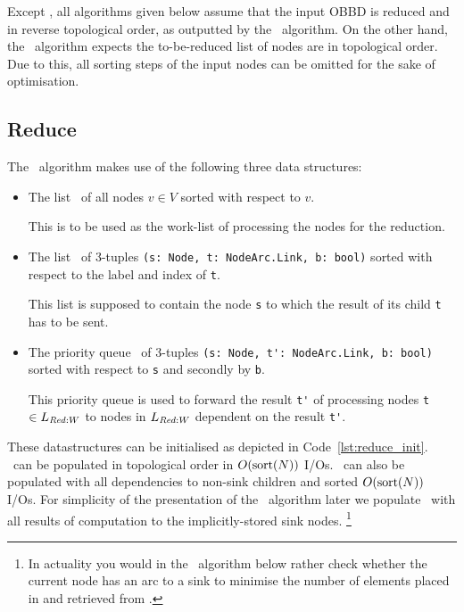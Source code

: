 Except \Reduce, all algorithms given below assume that the input OBBD is reduced
and in reverse topological order, as outputted by the \Reduce\ algorithm. On the
other hand, the \Reduce\ algorithm expects the to-be-reduced list of nodes are
in topological order. Due to this, all sorting steps of the input nodes can
be omitted for the sake of optimisation. \cite{Arge96}

\subsection{Reduce} \label{sec:theory_reduce}
The \Reduce\ algorithm makes use of the following three data structures:

\begin{itemize}
\item The list \ReduceLwork\ of all nodes $v \in V$ sorted with respect to $v$.

  This is to be used as the work-list of processing the nodes for the reduction.

\item The list \ReduceLdep\ of 3-tuples
  \lstinline{(s: Node, t: NodeArc.Link, b: bool)}
  sorted with respect to the label and index of \lstinline{t}.

 This list is supposed to contain the node \lstinline{s} to which the result of
 its child \lstinline{t} has to be sent.

\item The priority queue \ReduceQdep\ of 3-tuples
  \lstinline{(s: Node, t': NodeArc.Link, b: bool)} sorted with
  respect to \lstinline{s} and secondly by \lstinline{b}.

  This priority queue is used to forward the result \lstinline{t'} of processing
  nodes \lstinline{t} $\in L_{\mathit{Red:}W}$ to nodes in $L_{\mathit{Red:}W}$ dependent on
  the result \lstinline{t'}.
\end{itemize}
These datastructures can be initialised as depicted in
Code~\ref{lst:reduce_init}. \ReduceLwork\ can be populated in topological
order in $O(\text{sort}(N))$ I/Os. \ReduceLdep\ can also be populated with all
dependencies to non-sink children and sorted $O(\text{sort}(N))$ I/Os. For simplicity
of the presentation of the \Reduce\ algorithm later we populate \ReduceQdep\
with all results of computation to the implicitly-stored sink nodes.%
\footnote{In actuality you would in the \Reduce\ algorithm below rather check
  whether the current node has an arc to a sink to minimise the number of
  elements placed in and retrieved from \ReduceQdep.}

